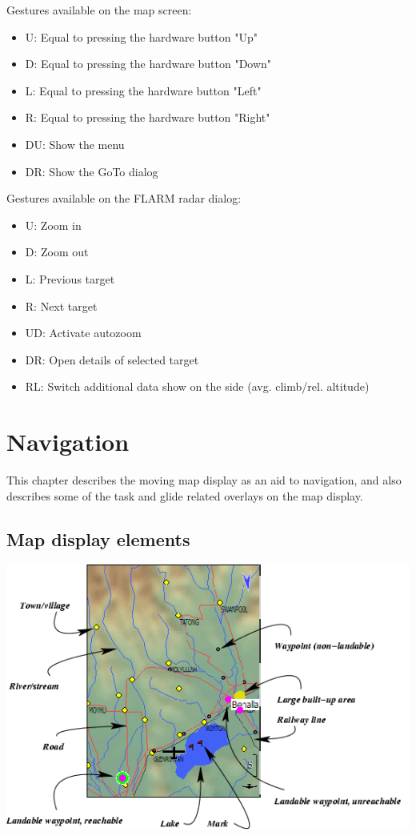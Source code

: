 \documentclass[a4paper,12pt]{refrep}
\begin{document}
  Gestures available on the map screen:
\begin{itemize}
\item U: Equal to pressing the hardware button "Up"
\item D: Equal to pressing the hardware button "Down"
\item L: Equal to pressing the hardware button "Left"
\item R: Equal to pressing the hardware button "Right"
\item DU: Show the menu
\item DR: Show the GoTo dialog
\end{itemize}


  Gestures available on the FLARM radar dialog:
\begin{itemize}
\item U: Zoom in
\item D: Zoom out
\item L: Previous target
\item R: Next target
\item UD: Activate autozoom
\item DR: Open details of selected target
\item RL: Switch additional data show on the side (avg. climb/rel. altitude)
\end{itemize}

\chapter{Navigation}\label{cha:navigation}
This chapter describes the moving map display as an aid to navigation,
and also describes some of the task and glide related overlays on the
map display.

\section{Map display elements}

\begin{maxipage}
\includegraphics[angle=0,width=\linewidth,keepaspectratio='true']{figures/fig-map.png}
\end{maxipage}
\end{document}
